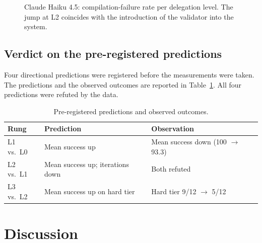 \documentclass[11pt,a4paper]{article}
\begin{document}
\begin{figure}[H]
\centering
{}
\caption{Claude Haiku 4.5: compilation-failure rate per delegation level. The jump at L2 coincides with the introduction of the validator into the system.}
\label{fig:haiku-cf}
\end{figure}

\subsection{Verdict on the pre-registered predictions}\label{sec:results:verdict}
Four directional predictions were registered before the measurements were taken. The predictions and the observed outcomes are reported in Table~\ref{tab:verdict}. All four predictions were refuted by the data.

\begin{table}[H]
\centering
\caption{Pre-registered predictions and observed outcomes.}
\label{tab:verdict}
\small
\begin{tabular}{lll}
\toprule
\textbf{Rung} & \textbf{Prediction} & \textbf{Observation} \\
\midrule
L1 vs.\ L0 & Mean success up                  & Mean success down (100 $\rightarrow$ 93.3) \\
L2 vs.\ L1 & Mean success up; iterations down & Both refuted \\
L3 vs.\ L2 & Mean success up on hard tier     & Hard tier 9/12 $\rightarrow$ 5/12 \\
\bottomrule
\end{tabular}
\end{table}

\section{Discussion}\label{sec:discussion}
\end{document}

